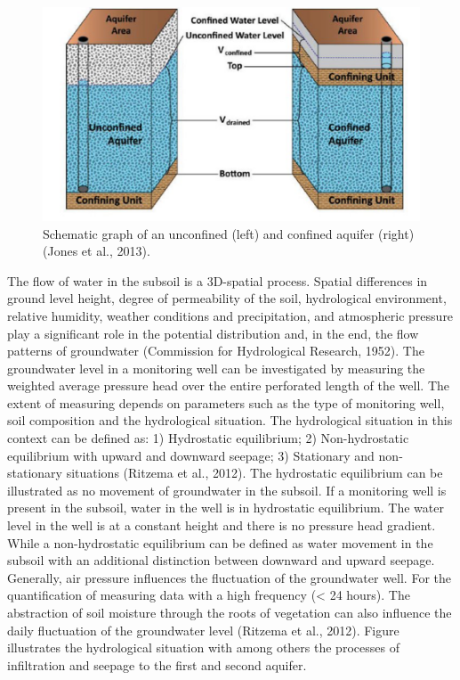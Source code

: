 \begin{figure}[h]
    \centering
    \includegraphics[width=0.95\linewidth]{figures/figures theory/Jones et al.png}
    \caption{Schematic graph of an unconfined (left) and confined aquifer (right) (Jones et al., 2013).}
    \label{aquifer}
\end{figure}

The flow of water in the subsoil is a 3D-spatial process. Spatial differences in ground level height, degree of permeability of the soil, hydrological environment, relative humidity, weather conditions and precipitation, and atmospheric pressure play a significant role in the potential distribution and, in the end, the flow patterns of groundwater (Commission for Hydrological Research, 1952). The groundwater level in a monitoring well can be investigated by measuring the weighted average pressure head over the entire perforated length of the well. 
The extent of measuring depends on parameters such as the type of monitoring well, soil composition and the hydrological situation. The hydrological situation in this context can be defined as: 1) Hydrostatic equilibrium; 2) Non-hydrostatic equilibrium with upward and downward seepage; 3) Stationary and non-stationary situations (Ritzema et al., 2012). The hydrostatic equilibrium can be illustrated as no movement of groundwater in the subsoil. If a monitoring well is present in the subsoil, water in the well is in hydrostatic equilibrium. The water level in the well is at a constant height and there is no pressure head gradient. While a non-hydrostatic equilibrium can be defined as water movement in the subsoil with an additional distinction between downward and upward seepage. Generally, air pressure influences the fluctuation of the groundwater well. For the quantification of measuring data with a high frequency (< 24 hours). The abstraction of soil moisture through the roots of vegetation can also influence the daily fluctuation of the groundwater level (Ritzema et al., 2012). Figure  illustrates the hydrological situation with among others the processes of infiltration and seepage to the first and second aquifer. 

